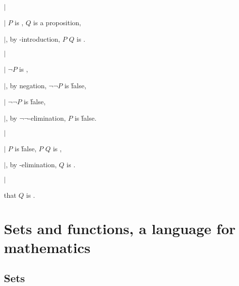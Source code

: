   $|$\hs \par
  $|$\hs {} $P$ is ,  $Q$ is a proposition, \par
  $|$\hs {}, by -introduction, $P$  $Q$ is . \par
  $|$\hs \par
  $|$\hs {} $\neg P$ is , \par
  $|$\hs {}, by negation, $\neg\neg P$ is \r{false}, \par
  $|$\hs {} $\neg\neg P$ is \r{false}, \par
  $|$\hs {}, by $\neg\neg$-elimination, $P$ is \r{false}. \par
  $|$\hs \par
  $|$\hs {} $P$ is \r{false},  $P$  $Q$ is , \par
  $|$\hs {}, by -elimination, $Q$ is . \par
  $|$\hs \par

 that $Q$ is . \par




\chapter{Sets and functions, a language for mathematics}



\section{Sets}

